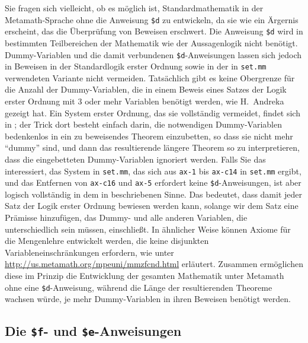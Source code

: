 \label{nodd}
Sie fragen sich vielleicht, ob es möglich ist, Standardmathematik in der Metamath-Sprache ohne die Anweisung \texttt{\$d} zu entwickeln, da sie wie ein Ärgernis erscheint, das die Überprüfung von Beweisen erschwert. Die Anweisung \texttt{\$d} wird in bestimmten Teilbereichen der Mathematik wie der Aussagenlogik nicht benötigt.  Dummy-Variablen und die damit verbundenen \texttt{\$d}-Anweisungen lassen sich jedoch in Beweisen in der Standardlogik erster Ordnung sowie in der in \texttt{set.mm} verwendeten Variante nicht vermeiden.  Tatsächlich gibt es keine Obergrenze für die Anzahl der Dummy-Variablen, die in einem Beweis eines Satzes der Logik erster Ordnung mit 3 oder mehr Variablen benötigt werden, wie H.\ Andr{e}ka \cite{Nemeti} gezeigt hat.  Ein System erster Ordnung, das sie vollständig vermeidet, findet sich in \cite{Megill}; der Trick dort besteht einfach darin, die notwendigen Dummy-Variablen bedenkenlos in ein zu beweisendes Theorem einzubetten, so dass sie nicht mehr "`dummy"' sind, und dann das resultierende längere Theorem so zu interpretieren, dass die eingebetteten Dummy-Variablen ignoriert werden.  Falls Sie das interessiert, das System in \texttt{set.mm}, das sich aus \texttt{ax-1} bis \texttt{ax-c14} in \texttt{set.mm} ergibt, und das Entfernen von \texttt{ax-c16} und \texttt{ax-5} erfordert keine \texttt{\$d}-Anweisungen, ist aber logisch vollständig in dem in \cite{Megill} beschriebenen Sinne.  Das bedeutet, dass damit jeder Satz der Logik erster Ordnung bewiesen werden kann, solange wir dem Satz eine Prämisse hinzufügen, das Dummy- und alle anderen Variablen, die unterschiedlich sein müssen, einschließt.  In ähnlicher Weise können Axiome für die Mengenlehre entwickelt werden, die keine disjunkten Variableneinschränkungen erfordern, wie unter \url{http://us.metamath.org/mpeuni/mmzfcnd.html} erläutert. Zusammen ermöglichen diese im Prinzip die Entwicklung der gesamten Mathematik unter Metamath ohne eine \texttt{\$d}-Anweisung, während die Länge der resultierenden Theoreme wachsen würde, je mehr Dummy-Variablen in ihren Beweisen benötigt werden.

\subsection{Die \texttt{\$f}- und \texttt{\$e}-Anweisungen}\label{dollaref}

